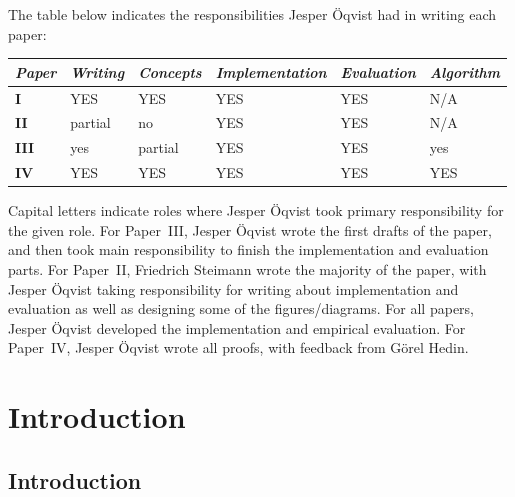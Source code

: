 \documentclass[10pt, twoside, openright]{book}
\begin{document}
\noindent
The table below indicates the responsibilities Jesper Öqvist had in writing each paper:

\vspace{1em}
\begin{center}
\begin{tabular}{llllll}
  \toprule
  \emph{Paper} & \emph{Writing} & \emph{Concepts} &  \emph{Implementation} & \emph{Evaluation} & \emph{Algorithm} \\
  \midrule
  \textbf{I}    & YES     & YES     & YES & YES & N/A \\
  \textbf{II}   & partial & no      & YES & YES & N/A \\
  \textbf{III}  & yes     & partial & YES & YES & yes \\
  \textbf{IV}   & YES     & YES     & YES & YES & YES \\
  \bottomrule
\end{tabular}
\end{center}
\vspace{1em}

\noindent
Capital letters indicate roles where Jesper Öqvist took primary responsibility for the
given role. For Paper~III, Jesper Öqvist wrote the first drafts of the paper, and then took main
responsibility to finish the implementation and evaluation parts. For Paper~II, Friedrich Steimann
wrote the majority of the paper, with Jesper Öqvist taking responsibility for writing about
implementation and evaluation as well as designing some of the figures/diagrams.
For all papers, Jesper Öqvist developed the implementation and empirical evaluation.
For Paper~IV, Jesper Öqvist wrote all proofs, with feedback from Görel Hedin.


\setcounter{tocdepth}{1}
\tableofcontents


\mainmatter
\renewcommand{\thesection}{\arabic{section}}
\renewcommand{\thefigure}{\arabic{figure}}
\renewcommand{\thetable}{\arabic{table}}
\renewcommand{\thechapter}{\Roman{chapter}}
\renewcommand{\theequation}{\arabic{equation}}
\renewcommand{\thelstlisting}{\arabic{lstlisting}}

\part{Introduction}
\chapter{Introduction}
\end{document}
